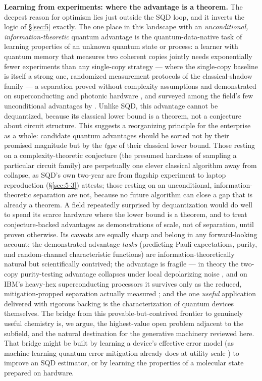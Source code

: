 \documentclass[onecolumn,a4paper]{quantumarticle}
\begin{document}
\textbf{Learning from experiments: where the advantage is a theorem.} The deepest reason for optimism lies just outside the SQD loop, and it inverts the logic of \S\ref{sec:5} exactly. The one place in this landscape with an \emph{unconditional, information-theoretic} quantum advantage is the quantum-data-native task of learning properties of an unknown quantum state or process: a learner with quantum memory that measures two coherent copies jointly needs exponentially fewer experiments than any single-copy strategy --- where the single-copy baseline is itself a strong one, randomized measurement protocols of the classical-shadow family \cite{huang2020} --- a separation proved without complexity assumptions \cite{chen2021} and demonstrated on superconducting and photonic hardware \cite{huang2022,liuphotonic2025}, and surveyed among the field's few unconditional advantages by \cite{huang2025}. Unlike SQD, this advantage cannot be dequantized, because its classical lower bound is a theorem, not a conjecture about circuit structure. This suggests a reorganizing principle for the enterprise as a whole: candidate quantum advantages should be sorted not by their promised magnitude but by the \emph{type} of their classical lower bound. Those resting on a complexity-theoretic conjecture (the presumed hardness of sampling a particular circuit family) are perpetually one clever classical algorithm away from collapse, as SQD's own two-year arc from flagship experiment to laptop reproduction (\S\ref{sec:5-3}) attests; those resting on an unconditional, information-theoretic separation are not, because no future algorithm can close a gap that is already a theorem. A field repeatedly surprised by dequantization would do well to spend its scarce hardware where the lower bound is a theorem, and to treat conjecture-backed advantages as demonstrations of scale, not of separation, until proven otherwise. Its caveats are equally sharp and belong in any forward-looking account: the demonstrated-advantage \emph{tasks} (predicting Pauli expectations, purity, and random-channel characteristic functions) are information-theoretically natural but scientifically contrived; the advantage is fragile --- in theory the two-copy purity-testing advantage collapses under local depolarizing noise \cite{cotler2025}, and on IBM's heavy-hex superconducting processors it survives only as the reduced, mitigation-propped separation actually measured \cite{seif2024}; and the one \emph{useful} application delivered with rigorous backing is the characterization of quantum devices themselves. The bridge from this provable-but-contrived frontier to genuinely useful chemistry is, we argue, the highest-value open problem adjacent to the subfield, and the natural destination for the generative machinery reviewed here. That bridge might be built by learning a device's effective error model (as machine-learning quantum error mitigation already does at utility scale \cite{liao2024}) to improve an SQD estimator, or by learning the properties of a molecular state prepared on hardware.
\end{document}
